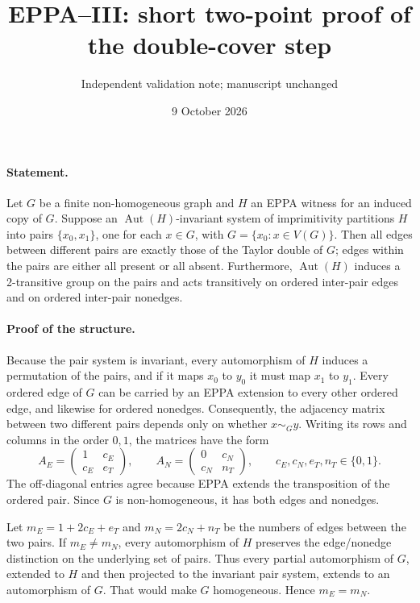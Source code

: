 \documentclass[11pt,a4paper]{article}
\title{EPPA--III: short two-point proof of the double-cover step}
\author{Independent validation note; manuscript unchanged}
\date{9 October 2026}
\begin{document}
\maketitle

\paragraph{Statement.}
Let \(G\) be a finite non-homogeneous graph and
\(H\) an EPPA witness for an induced copy of \(G\).
Suppose an \(\operatorname{Aut}(H)\)-invariant
system of imprimitivity partitions \(H\) into pairs
\(\{x_0,x_1\}\), one for each \(x\in G\), with
\(G=\{x_0:x\in V(G)\}\).
Then all edges between different pairs are
exactly those of the Taylor double of \(G\);
edges within the pairs are either all present or
all absent. Furthermore, \(\operatorname{Aut}(H)\)
induces a 2-transitive group on the pairs and
acts transitively on ordered inter-pair edges
and on ordered inter-pair nonedges.

\paragraph{Proof of the structure.}
Because the pair system is invariant, every
automorphism of \(H\) induces a permutation
of the pairs, and if it maps \(x_0\) to \(y_0\)
it must map \(x_1\) to \(y_1\).
Every ordered edge of \(G\) can be carried by
an EPPA extension to every other ordered edge,
and likewise for ordered nonedges.
Consequently, the adjacency matrix between
two different pairs depends only on whether
\(x\sim_G y\). Writing its rows and columns in
the order \(0,1\), the matrices have the form
\[
  A_E=\begin{pmatrix}1&c_E\\c_E&e_T\end{pmatrix},
  \qquad
  A_N=\begin{pmatrix}0&c_N\\c_N&n_T\end{pmatrix},
  \qquad c_E,c_N,e_T,n_T\in\{0,1\}.
\]
The off-diagonal entries agree because EPPA
extends the transposition of the ordered pair.
Since \(G\) is non-homogeneous, it has both
edges and nonedges.

Let \(m_E=1+2c_E+e_T\) and \(m_N=2c_N+n_T\)
be the numbers of edges between the two pairs.
If \(m_E\ne m_N\), every automorphism of \(H\)
preserves the edge/nonedge distinction on the
underlying set of pairs. Thus every partial
automorphism of \(G\), extended to \(H\) and
then projected to the invariant pair system,
extends to an automorphism of \(G\).
That would make \(G\) homogeneous. Hence
\(m_E=m_N\).
\end{document}
